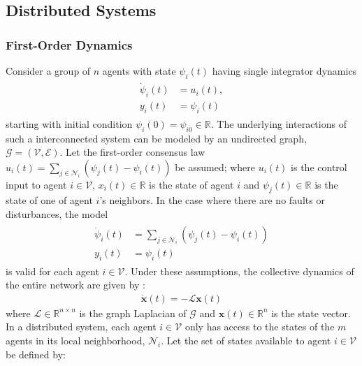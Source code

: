 \documentclass[letterpaper, 10 pt, conference]{ieeeconf}  %
\def\R{\mathbb{R}}
\def\cG{\mathcal{G}}
\def\cL{\mathcal{L}}
\begin{document}
\subsection{Distributed Systems}
\subsubsection{First-Order Dynamics} Consider a group of $n$ agents with state $\psi_i(t)$ having single integrator dynamics 
\begin{gather} 
\begin{aligned}
\dot{\psi}_i(t) &= u_i(t), \nonumber \\
y_i(t) &= \psi_i (t) \nonumber
\end{aligned}
\end{gather}
starting with initial condition $\psi_i (0) = \psi_{i0} \in \R$. The underlying interactions of such a interconnected system can be modeled by an undirected graph, $\cG = (\mathcal{V},\mathcal{E})$. Let the first-order consensus law 
$u_i(t) = \sum_{j \in \mathcal{N}_i} (\psi_j(t) - \psi_i(t))$
be assumed; where $u_i(t)$ is the control input to agent $i \in \mathcal{V}$, $x_i(t) \in \mathbb{R}$ is the state of agent $i$ and $\psi_j(t) \in \mathbb{R}$ is the state of one of agent $i$'s neighbors. In the case where there are no faults or disturbances, the model 
\begin{gather} 
\begin{aligned} \label{eq:agentCons}
\dot{\psi}_i(t) &= \sum_{j \in \mathcal{N}_i} (\psi_j(t) - \psi_i(t)) \\
y_i(t) &= \psi_i(t) \nonumber
\end{aligned}
\end{gather}
is valid for each agent $i \in \mathcal{V}$. Under these assumptions, the collective dynamics of the entire network are given by \cite{olfati-saber_consensus_2007}:
\begin{align} \label{eq:consensysDynSingle}
\dot{\mathbf{x}}(t) = -\cL\mathbf{x}(t)
\end{align}
where $\cL \in \mathbb{R}^{n \times n}$ is the graph Laplacian of $\cG$ and $\mathbf{x}(t) \in \mathbb{R}^n$ is the state vector. In a distributed system, each agent $i \in \mathcal{V}$ only has access to the states of the $m$ agents in its local neighborhood, $\mathcal{N}_i$. Let the set of states available to agent $i \in \mathcal{V}$ be defined by:
\end{document}
